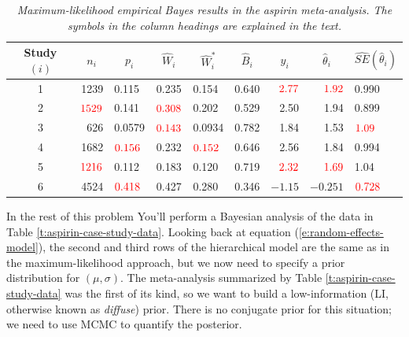 \documentclass[12pt]{article}
\newcommand{\tcr}[1]{\textcolor{red}{#1}}
\begin{document}
\begin{table}[t!]

\centering

\caption{\textit{Maximum-likelihood empirical Bayes results in the aspirin meta-analysis. The symbols in the column headings are explained in the text.}}

\label{t:mle-results}

\bigskip

\begin{tabular}{c|rlclcrrl}

Study $( i )$ & \multicolumn{1}{c}{$n_i$} & \multicolumn{1}{c}{$p_i$} & $\hat{ W }_i$ & \multicolumn{1}{c}{$\hat{ W }_i^*$} & $\hat{ B }_i$ & \multicolumn{1}{c}{$y_i$} & \multicolumn{1}{c}{$\hat{ \theta }_i$} & \multicolumn{1}{c}{$\widehat{ SE } \! \left( \hat{ \theta }_i \right)$}\\

\hline

1 & 1239 & 0.115 & 0.235 & 0.154 & 0.640 & $\tcr{2.77}$ & $\tcr{1.92}$& 0.990 \\

2 & $\tcr{1529}$& 0.141 & $\tcr{0.308}$ & 0.202 & 0.529 & 2.50 & 1.94 & 0.899 \\

3 & 626 & 0.0579 &$\tcr{0.143}$ & 0.0934 & 0.782 & 1.84 & 1.53 & $\tcr{1.09}$\\

4 & 1682 & $\tcr{0.156}$ & 0.232 & $\tcr{0.152}$& 0.646 & 2.56 & 1.84 & 0.994 \\

5 & $\tcr{1216}$& 0.112 & 0.183 & 0.120 & 0.719 &$\tcr{2.32}$ & $\tcr{1.69}$& 1.04 \\

6 & 4524 & $\tcr{0.418}$& 0.427 & 0.280 & 0.346 & $-1.15$ & $-0.251$ & $\tcr{0.728}$

\end{tabular}

\end{table}

In the rest of this problem You'll perform a Bayesian analysis of the data in Table \ref{t:aspirin-case-study-data}. Looking back at equation (\ref{e:random-effects-model}), the second and third rows of the hierarchical model are the same as in the maximum-likelihood approach, but we now need to specify a prior distribution for $( \mu, \sigma )$. The meta-analysis summarized by Table \ref{t:aspirin-case-study-data} was the first of its kind, so we want to build a low-information (LI, otherwise known as \textit{diffuse}) prior. There is no conjugate prior for this situation; we need to use MCMC to quantify the posterior.
\end{document}
